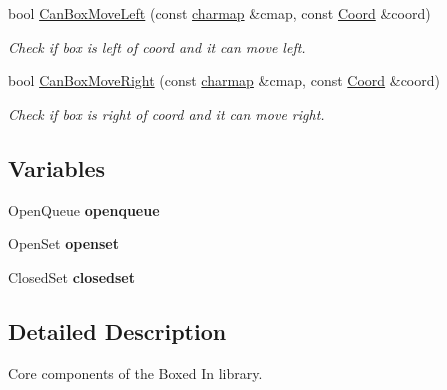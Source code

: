 \begin{DoxyCompactItemize}
bool \hyperlink{namespaceboxedin_a1714f09fb58130ee860623d8c01e1be8}{Can\+Box\+Move\+Left} (const \hyperlink{namespaceboxedin_a95e88d677e0a17d3f9e4a9b0de980c4f}{charmap} \&cmap, const \hyperlink{namespaceboxedin_afc0dedc740afcefb60a4dac20d984b16}{Coord} \&coord)
\begin{DoxyCompactList}\small\item\em Check if box is left of coord and it can move left. \end{DoxyCompactList}\item 
bool \hyperlink{namespaceboxedin_a638e327c1179153f5cf96f5967c29a13}{Can\+Box\+Move\+Right} (const \hyperlink{namespaceboxedin_a95e88d677e0a17d3f9e4a9b0de980c4f}{charmap} \&cmap, const \hyperlink{namespaceboxedin_afc0dedc740afcefb60a4dac20d984b16}{Coord} \&coord)
\begin{DoxyCompactList}\small\item\em Check if box is right of coord and it can move right. \end{DoxyCompactList}\end{DoxyCompactItemize}
\subsection*{Variables}
\begin{DoxyCompactItemize}
\item 
\hypertarget{namespaceboxedin_aa119c4a108b02ce01f42045fa7516aed}{Open\+Queue {\bfseries openqueue}}\label{namespaceboxedin_aa119c4a108b02ce01f42045fa7516aed}

\item 
\hypertarget{namespaceboxedin_a2474c340bee49abd8e4131b8aa42501f}{Open\+Set {\bfseries openset}}\label{namespaceboxedin_a2474c340bee49abd8e4131b8aa42501f}

\item 
\hypertarget{namespaceboxedin_a2c735e19072e8639dd61b4d6656b746e}{Closed\+Set {\bfseries closedset}}\label{namespaceboxedin_a2c735e19072e8639dd61b4d6656b746e}

\end{DoxyCompactItemize}


\subsection{Detailed Description}
Core components of the Boxed In library. 

